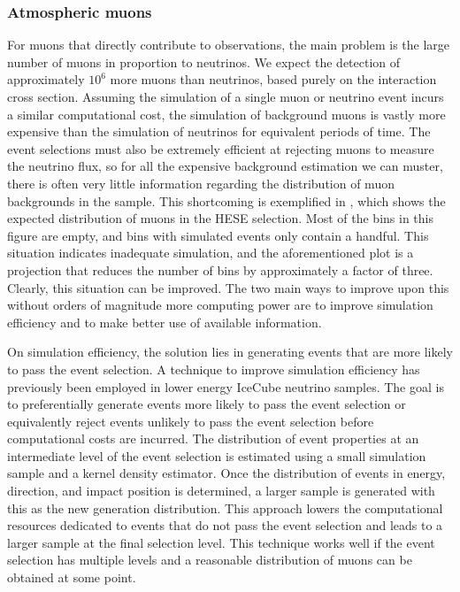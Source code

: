 \subsubsection{Atmospheric muons}
For muons that directly contribute to observations, the main problem is the large number of muons in proportion to neutrinos.
We expect the detection of approximately $10^6$ more muons than neutrinos, based purely on the interaction cross section.
Assuming the simulation of a single muon or neutrino event incurs a similar computational cost, the simulation of background muons is vastly more expensive than the simulation of neutrinos for equivalent periods of time.
The event selections must also be extremely efficient at rejecting muons to measure the neutrino flux, so for all the expensive background estimation we can muster, there is often very little information regarding the distribution of muon backgrounds in the sample.
This shortcoming is exemplified in , which shows the expected distribution of muons in the HESE selection.
Most of the bins in this figure are empty, and bins with simulated events only contain a handful.
This situation indicates inadequate simulation, and the aforementioned plot is a projection that reduces the number of bins by approximately a factor of three.
Clearly, this situation can be improved.
The two main ways to improve upon this without orders of magnitude more computing power are to improve simulation efficiency and to make better use of available information.

On simulation efficiency, the solution lies in generating events that are more likely to pass the event selection.
A technique to improve simulation efficiency has previously been employed in lower energy IceCube neutrino samples.
The goal is to preferentially generate events more likely to pass the event selection or equivalently reject events unlikely to pass the event selection before computational costs are incurred.
The distribution of event properties at an intermediate level of the event selection is estimated using a small simulation sample and a kernel density estimator.
Once the distribution of events in energy, direction, and impact position is determined, a larger sample is generated with this as the new generation distribution.
This approach lowers the computational resources dedicated to events that do not pass the event selection and leads to a larger sample at the final selection level.
This technique works well if the event selection has multiple levels and a reasonable distribution of muons can be obtained at some point.

